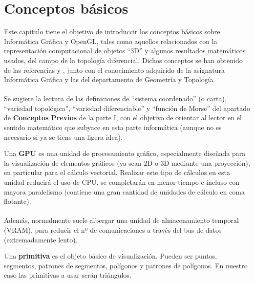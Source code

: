 
\chapter{Conceptos básicos}

Este capítulo tiene el objetivo de introduccir los conceptos básicos sobre Informática Gráfica y OpenGL, tales como aquellos relacionados con la representación computacional de objetos ``3D'' y algunos resultados matemáticos usados, del campo de la topología diferencial. Dichos conceptos se han obtenido de las referencias \cite{KhronosWiki} y \cite{LearnOGL}, junto con el conocimiento adquirido de la asignatura Informática Gráfica y las del departamento de Geometría y Topología.\\
\\Se sugiere la lectura de las definiciones de ``sistema coordenado'' (o carta), ``variedad topológica'', ``variedad diferenciable'' y ``función de Morse'' del apartado de \textbf{Conceptos Previos} de la parte I, con el objetivo de orientar al lector en el sentido matemático que subyace en esta parte informática (aunque no es necesario si ya se tiene una ligera idea).\\

\begin{definicion} Una \textbf{GPU} es una unidad de procesamiento gráfico, especialmente diseñada para la visualización de elementos gráficos (ya sean $2$D o $3$D mediante una proyección), en particular para el cálculo vectorial. Realizar este tipo de cálculos en esta unidad reducirá el uso de CPU, se completarán en menor tiempo e incluso con mayora paralelismo (contiene una gran cantidad de unidades de cálculo en coma flotante).\\
\\Además, normalmente suele albergar una unidad de almacenamiento temporal (VRAM), para reducir el nº de comunicaciones a través del bus de datos (extremadamente lento).
\end{definicion}

\begin{definicion} Una \textbf{primitiva} es el objeto básico de visualización. Pueden ser puntos, segmentos, patrones de segmentos, polígonos y patrones de polígonos. En nuestro caso las primitivas a usar serán triángulos.
\end{definicion}

